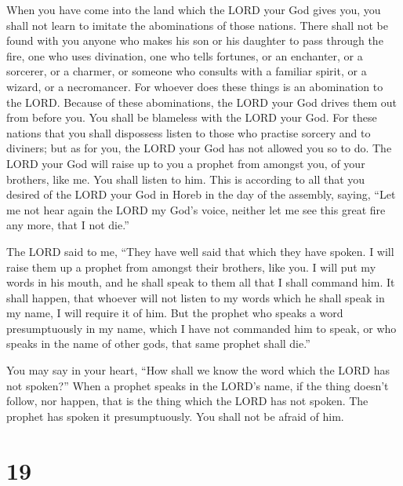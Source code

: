  When you have come into the land which the LORD your God
gives you, you shall not learn to imitate the abominations of those
nations.  There shall not be found with you anyone who
makes his son or his daughter to pass through the fire, one who uses
divination, one who tells fortunes, or an enchanter, or a sorcerer,
 or a charmer, or someone who consults with a familiar
spirit, or a wizard, or a necromancer.  For whoever does
these things is an abomination to the LORD. Because of these
abominations, the LORD your God drives them out from before you.
 You shall be blameless with the LORD your God.
 For these nations that you shall dispossess listen to
those who practise sorcery and to diviners; but as for you, the LORD
your God has not allowed you so to do.  The LORD your God
will raise up to you a prophet from amongst you, of your brothers, like
me. You shall listen to him.  This is according to all that
you desired of the LORD your God in Horeb in the day of the assembly,
saying, ``Let me not hear again the LORD my God's voice, neither let me
see this great fire any more, that I not die.''

 The LORD said to me, ``They have well said that which they
have spoken.  I will raise them up a prophet from amongst
their brothers, like you. I will put my words in his mouth, and he shall
speak to them all that I shall command him.  It shall
happen, that whoever will not listen to my words which he shall speak in
my name, I will require it of him.  But the prophet who
speaks a word presumptuously in my name, which I have not commanded him
to speak, or who speaks in the name of other gods, that same prophet
shall die.''

 You may say in your heart, ``How shall we know the word
which the LORD has not spoken?''  When a prophet speaks in
the LORD's name, if the thing doesn't follow, nor happen, that is the
thing which the LORD has not spoken. The prophet has spoken it
presumptuously. You shall not be afraid of him.

\hypertarget{section-18}{%
\section{19}\label{section-18}}

